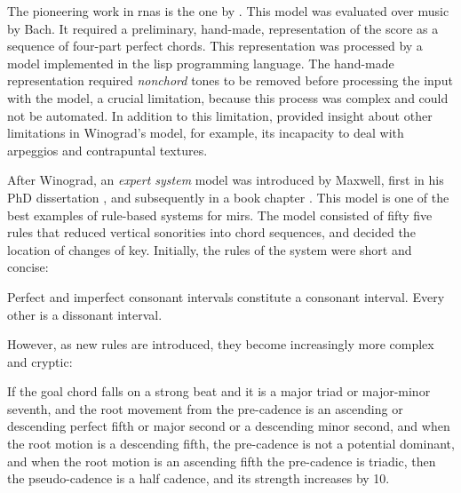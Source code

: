 


The pioneering work in \glspl{rna} is the one by
\textcite{winograd1968linguistics}. This model was evaluated
over music by Bach. It required a preliminary, hand-made,
representation of the score as a sequence of four-part
perfect chords. This representation was processed by a model
implemented in the \gls{lisp} programming language. The
hand-made representation required \emph{nonchord} tones to
be removed before processing the input with the model, a
crucial limitation, because this process was complex and
could not be automated. In addition to this limitation,
\textcite{temperley1997algorithm} provided insight about
other limitations in Winograd's model, for example, its
incapacity to deal with arpeggios and contrapuntal textures.

After Winograd, an \emph{expert system} model was introduced
by Maxwell, first in his PhD dissertation
\parencite{maxwell1984artificial}, and subsequently in a
book chapter \parencite{maxwell1992expert}. This model is
one of the best examples of rule-based systems for
\glspl{mir}. The model consisted of fifty five rules that
reduced vertical sonorities into chord sequences, and
decided the location of changes of key. Initially, the rules
of the system were short and concise:

\begin{italicquotes}
    Perfect and imperfect consonant intervals constitute a
    consonant interval. Every other is a dissonant interval.
\end{italicquotes}

However, as new rules are introduced, they become
increasingly more complex and cryptic:

\begin{italicquotes}
    If the goal chord falls on a strong beat and it is a
    major triad or major-minor seventh, and the root
    movement from the pre-cadence is an ascending or
    descending perfect fifth or major second or a descending
    minor second, and when the root motion is a descending
    fifth, the pre-cadence is not a potential dominant, and
    when the root motion is an ascending fifth the
    pre-cadence is triadic, then the pseudo-cadence is a
    half cadence, and its strength increases by 10.
\end{italicquotes}

